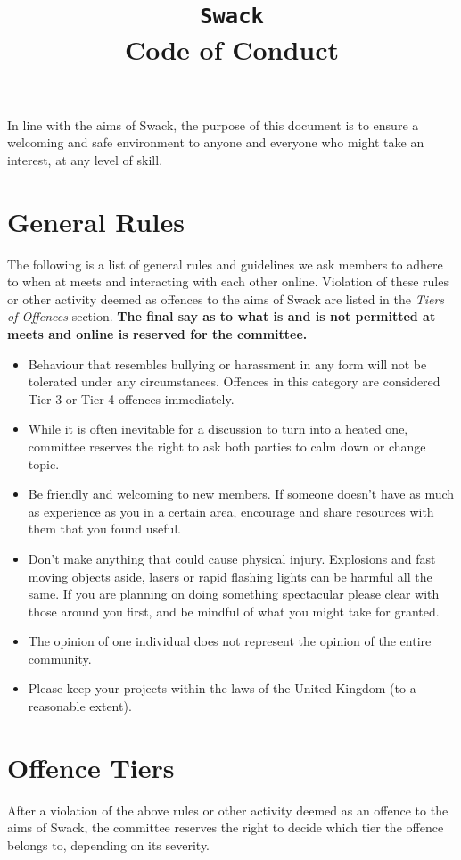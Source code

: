 \documentclass[12pt]{extarticle}
\title{\vspace{-2cm}\texttt{Swack} \\ {Code of Conduct}\vspace{-1cm}}
\date{}
\begin{document}
	\maketitle
	In line with the aims of Swack, the purpose of this document is to ensure a welcoming and safe environment to anyone and everyone who might take an interest, at any level of skill. 
	
	\section*{General Rules}
	The following is a list of general rules and guidelines we ask members to adhere to when at meets and interacting with each other online. Violation of these rules or other activity deemed as offences to the aims of Swack are listed in the \emph{Tiers of Offences} section.
    \textbf{The final say as to what is and is not permitted at meets and online is reserved for the committee.}
    
	\begin{itemize}
		\item Behaviour that resembles bullying or harassment in any form will not be tolerated under any circumstances. Offences in this category are considered Tier 3 or Tier 4 offences immediately.
		\item While it is often inevitable for a discussion to turn into a heated one, committee reserves the right to ask both parties to calm down or change topic.
		\item Be friendly and welcoming to new members. If someone doesn't have as much as experience as you in a certain area, encourage and share resources with them that you found useful.
		\item Don't make anything that could cause physical injury. Explosions and fast moving objects aside, lasers or rapid flashing lights can be harmful all the same. If you are planning on doing something spectacular please clear with those around you first, and be mindful of what you might take for granted.
		\item The opinion of one individual does not represent the opinion of the entire community.
		\item Please keep your projects within the laws of the United Kingdom (to a reasonable extent).
	\end{itemize}   
	
	\section*{Offence Tiers}
	After a violation of the above rules or other activity deemed as an offence to the aims of Swack, the committee reserves the right to decide which tier the offence belongs to, depending on its severity. 
	
\end{document}
